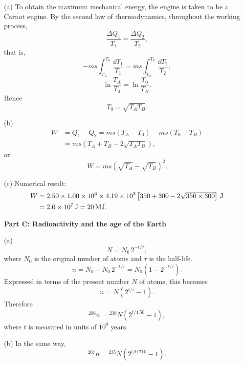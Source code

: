 (a) To obtain the maximum mechanical energy, the engine is taken to be a Carnot engine. By the second law of thermodynamics, throughout the working process,
\begin{equation*}
\frac{\Delta Q_1}{T_1}=\frac{\Delta Q_2}{T_2} ,
\end{equation*}
that is,
\begin{equation*}
-ms\int_{T_A}^{T_0}\frac{\dd T_1}{T_1}
=ms\int_{T_B}^{T_0}\frac{\dd T_2}{T_2} ,
\end{equation*}
\begin{equation*}
\ln\frac{T_A}{T_0}=\ln\frac{T_0}{T_B} .
\end{equation*}
Hence
\begin{equation*}
T_0=\sqrt{T_AT_B} .
\end{equation*}

(b)
\begin{align*}
W&=Q_1-Q_2=ms(T_A-T_0)-ms(T_0-T_B)\\
&=ms\left(T_A+T_B-2\sqrt{T_AT_B}\right),
\end{align*}
or
\begin{equation*}
W=ms\left(\sqrt{T_A}-\sqrt{T_B}\right)^2 .
\end{equation*}

(c) Numerical result:
\begin{align*}
W&=2.50\times1.00\times10^3\times4.19\times10^3
\left[350+300-2\sqrt{350\times300}\right]\,\mathrm{J}\\
&=2.0\times10^7\,\mathrm{J}=20\,\mathrm{MJ} .
\end{align*}

\textbf{Part C: Radioactivity and the age of the Earth}

(a)
\begin{equation*}
N=N_0\,2^{-t/\tau} ,
\end{equation*}
where $N_0$ is the original number of atoms and $\tau$ is the half-life.
\begin{equation*}
n=N_0-N_0\,2^{-t/\tau}=N_0\left(1-2^{-t/\tau}\right).
\end{equation*}
Expressed in terms of the present number $N$ of atoms, this becomes
\begin{equation*}
n=N\left(2^{t/\tau}-1\right).
\end{equation*}
Therefore
\begin{equation*}
^{206}n={}^{238}N\left(2^{t/4.50}-1\right),
\end{equation*}
where $t$ is measured in units of $10^{9}$ years.

(b) In the same way,
\begin{equation*}
^{207}n={}^{235}N\left(2^{t/0.710}-1\right).
\end{equation*}

